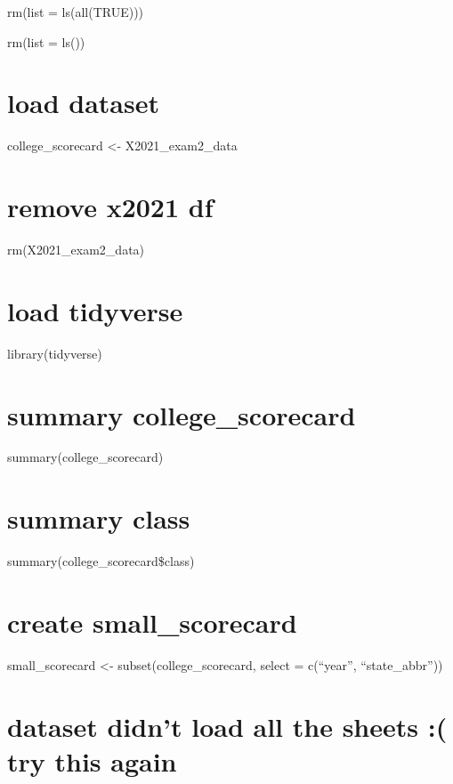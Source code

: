 \documentclass[
]{article}
\begin{document}
rm(list = ls(all(TRUE)))

rm(list = ls())

\hypertarget{load-dataset}{%
\section{load dataset}\label{load-dataset}}

college\_scorecard \textless- X2021\_exam2\_data

\hypertarget{remove-x2021-df}{%
\section{remove x2021 df}\label{remove-x2021-df}}

rm(X2021\_exam2\_data)

\hypertarget{load-tidyverse}{%
\section{load tidyverse}\label{load-tidyverse}}

library(tidyverse)

\hypertarget{summary-college_scorecard}{%
\section{summary college\_scorecard}\label{summary-college_scorecard}}

summary(college\_scorecard)

\hypertarget{summary-class}{%
\section{summary class}\label{summary-class}}

summary(college\_scorecard\$class)

\hypertarget{create-small_scorecard}{%
\section{create small\_scorecard}\label{create-small_scorecard}}

small\_scorecard \textless- subset(college\_scorecard, select =
c(``year'', ``state\_abbr''))

\hypertarget{dataset-didnt-load-all-the-sheets-try-this-again}{%
\section{dataset didn't load all the sheets :( try this
again}\label{dataset-didnt-load-all-the-sheets-try-this-again}}
\end{document}
